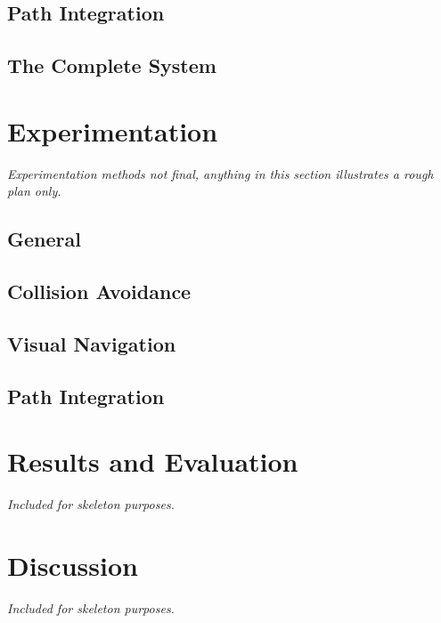 \documentclass[a4paper,11pt,twoside,openright]{article}
\let\oldsection\section
\def\section{\cleardoublepage\oldsection}
\begin{document}
\subsection{ Path Integration }
\subsection{ The Complete System}

\section{Experimentation}\label{sec:test}
\textit{
  Experimentation methods not final, anything in this section illustrates a
  rough plan only.
}
\subsection{General}
\subsection{Collision Avoidance}
\subsection{Visual Navigation}
\subsection{Path Integration}
\newpage

\section{ Results and Evaluation } \label{sec:results}
\textit{Included for skeleton purposes.}
\newpage

\section{ Discussion }
\textit{Included for skeleton purposes.}
\newpage



\end{document}
